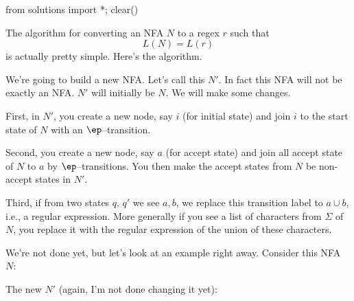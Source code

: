 \begin{python0}
  from solutions import *; clear()
\end{python0}

The algorithm for converting an NFA $N$ to a regex $r$ such that
\[
L(N) = L(r)
\]
is actually pretty simple.
Here's the algorithm.

We're going to build a new NFA. 
Let's call this $N'$.
In fact this NFA will not be exactly an NFA.
$N'$ will initially be $N$.
We will make some changes.

First, in $N'$, 
you create a new node, say $i$ (for initial state) and join $i$ to 
the start state of $N$ with an $\ep$--transition.

Second, 
you create a new node, say $a$ (for accept state) and join 
all accept state of $N$ to $a$ by $\ep$--transitions.
You then make the accept states from $N$ be non-accept states in $N'$.

Third,
if from two states $q$, $q'$ we see $a,b$, we
replace this transition label to $a \cup b$, i.e., a regular expression.
More generally if you see a list of characters from $\Sigma$ of $N$,
you replace it with the regular expression of the union of these characters.

We're not done yet, but let's look at an example right away.
Consider this NFA $N$:
\begin{center}
\end{center}
The new $N'$ (again, I'm not done changing it yet):
\begin{center}
\end{center}

